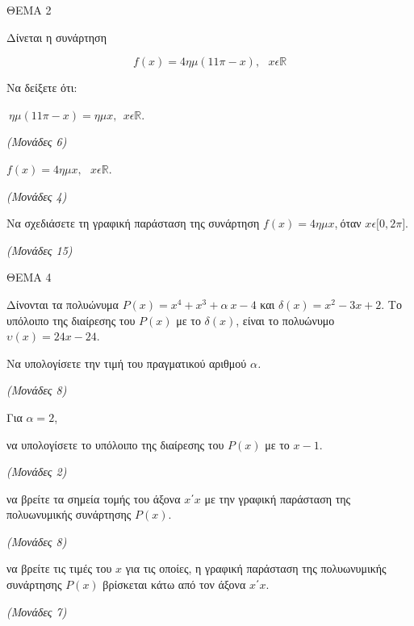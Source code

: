 \documentclass[11pt,a4paper,twoside]{book}
\newcommand{\monades}[1]{\hfill \textit{(Μονάδες #1)}}
\begin{document}
\vspace{4mm}

ΘΕΜΑ 2

Δίνεται η συνάρτηση

\begin{equation*}f(x) = 4\eta\mu(11\pi - x),\ \ \ x\epsilon\mathbb{R}\end{equation*}

\begin{alist}
\item Να δείξετε ότι:

\begin{rlist}
\item $\ \eta\mu(11\pi - x) = \eta\mu x,\ \ x\epsilon\mathbb{R}$.$\ $

\monades{6}

\item $f(x) = 4\eta\mu x,\ \ \ x\epsilon\mathbb{R.}$

\monades{4}

\end{rlist}
\item Να σχεδιάσετε τη γραφική παράσταση της συνάρτηση $f(x) = 4\eta\mu x$,$\ $όταν $x\epsilon\lbrack 0,2\pi\rbrack.$

\monades{15}
\end{alist}

\vspace{4mm}

ΘΕΜΑ 4

Δίνονται τα πολυώνυμα $P(x) = x^{4} + x^{3} + \alpha\ x - 4$ και $\delta(x) = x^{2} - 3x + 2$. Το υπόλοιπο της διαίρεσης του $P(x)$ με το $\delta(x)$, είναι το πολυώνυμο $\upsilon(x) = 24x - 24$.

\begin{alist}
\item Να υπολογίσετε την τιμή του πραγματικού αριθμού $\alpha$\emph{.}

\monades{8}

\item Για $\alpha = 2$,

\end{alist}
\begin{alist}
\item
  να υπολογίσετε το υπόλοιπο της διαίρεσης του $P(x)$ με το $x - 1.$

\monades{2}


\end{alist}
\begin{alist}
\item
  να βρείτε τα σημεία τομής του άξονα $x΄x$ με την γραφική παράσταση της πολυωνυμικής συνάρτησης $P(x)$.

\monades{8}


\end{alist}
\begin{alist}
\item
  να βρείτε τις τιμές του $x$ για τις οποίες, η γραφική παράσταση της πολυωνυμικής συνάρτησης $P(x)$ βρίσκεται κάτω από τον άξονα $x΄x$.

\monades{7}
\end{alist}
\end{document}
